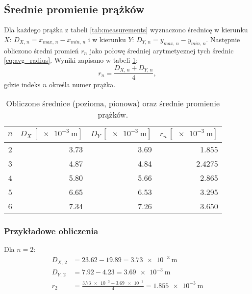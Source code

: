 \documentclass[a4paper,12pt]{article}
\begin{document}
\subsection{Średnie promienie prążków}

Dla każdego prążka z tabeli \ref{tab:measurements} wyznaczono średnicę w kierunku $X$: $D_{X,\,n} = x_{max,\,n} - x_{min,\,n}$ i w kierunku $Y$: $D_{Y,\,n} = y_{max,\,n} - y_{min,\,n}$. Następnie obliczono średni promień $r_{n}$ jako połowę średniej arytmetycznej tych średnic \eqref{eq:avg_radius}. Wyniki zapisano w tabeli \ref{tab:radii}:
\begin{equation}
    \label{eq:avg_radius}
    r_{n} = \frac{D_{X,\,n} + D_{Y,\,n}}{4},
\end{equation}
gdzie indeks $n$ określa numer prążka.

\begin{table}[H]
    \centering
    \begin{tabular}{|c|r|r|r|}
        \hline
        \textbf{$n$} & \textbf{$D_{X}\,[\SI{e-3}{\meter}]$} & \textbf{$D_{Y}\,[\SI{e-3}{\meter}]$} & \textbf{$r_{n}\,[\SI{e-3}{\meter}]$} \\
        \hline
        \num{2} & \num{3.73} & \num{3.69} & \num{1.855} \\ \hline
        \num{3} & \num{4.87} & \num{4.84} & \num{2.4275} \\ \hline
        \num{4} & \num{5.80} & \num{5.66} & \num{2.865} \\ \hline
        \num{5} & \num{6.65} & \num{6.53} & \num{3.295} \\ \hline
        \num{6} & \num{7.34} & \num{7.26} & \num{3.650} \\ \hline
    \end{tabular}
    \caption{Obliczone średnice (pozioma, pionowa) oraz średnie promienie prążków.}
    \label{tab:radii}
\end{table}


\subsubsection*{Przykładowe obliczenia}
Dla $n=2$:
\begin{align*}
    D_{X,\,2} & = \num{23.62} - \num{19.89} = \SI{3.73e-3}{\meter}                \\
    D_{Y,\,2} & = \num{7.92} - \num{4.23} = \SI{3.69e-3}{\meter}                  \\
    r_{2}     & = \frac{\num{3.73e-3} + \num{3.69e-3}}{4} = \SI{1.855e-3}{\meter}
\end{align*}
\end{document}

